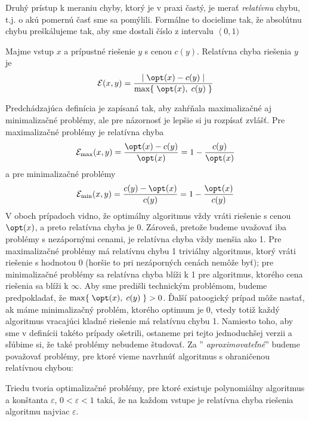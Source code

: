 Druhý prístup k meraniu chyby, ktorý je v praxi častý, je merať {\em relatívnu}
chybu, t.j. o akú pomernú časť sme sa pomýlili. Formálne to docielime tak, že
absolútnu chybu preškálujeme tak, aby sme dostali číslo z intervalu
$\left\langle0,1)\right.$


\begin{framed}
  \begin{dfn}
    Majme vstup $x$ a prípustné riešenie $y$  s cenou $c(y)$. Relatívna chyba riešenia $y$ je
    \[{\cal E}(x,y) = \frac{ |\; \opt(x)-c(y) \;|}{\max\{\; \opt(x), \; c(y)\; \}} \]
  \end{dfn}
\end{framed}

\noindent
Predchádzajúca definícia je zapísaná tak, aby zahŕňala maximalizačné aj
minimalizačné problémy, ale pre názornosť je lepšie si ju rozpísať zvlášť. Pre
maximalizačné problémy je relatívna chyba 
\[ {\cal E}_{\max}(x,y) = \frac{  \opt(x) - c(y) }{\opt(x)} = 1 - \frac{c(y)}{\opt(x)} \] 
a pre minimalizačné
problémy 
\[ {\cal E}_{\min}(x,y) = \frac{ c(y) - \opt(x)  }{c(y)} = 1 -\frac{\opt(x)}{c(y)} \] 
V oboch prípadoch vidno, že optimálny algoritmus vždy
vráti riešenie s cenou $\opt(x)$, a preto relatívna chyba je $0$. Zároveň,
pretože budeme uvažovať iba problémy s nezápornými cenami,  je relatívna chyba
vždy menšia ako 1. Pre maximalizačné problémy má relatívnu chybu 1 triviálny
algoritmus, ktorý vráti riešenie s hodnotou $0$ (horšie to pri nezáporných
cenách nemôže byť); pre minimalizačné problémy sa relatívna chyba blíži k 1 pre
algoritmus, ktorého cena riešenia sa blíži k $\infty$.  
Aby sme predišli technickým problémom, budeme predpokladať, že $\max\{\; \opt(x), \; c(y)\; \}>0$.
Ďalší patoogický prípad môže nastať, ak máme minimalizačný problém, ktorého optimum je 0, vtedy totiž
každý algoritmus vracajúci kladné riešenie má relatívnu chybu 1. Namiesto toho, aby sme 
v definícii takéto prípady ošetrili, ostaneme pri tejto jednoduchšej verzii a sľúbime si, že také
problémy nebudeme študovať.
Za ''{\em
aproximovateľné}'' budeme považovať problémy, pre ktoré vieme navrhnúť
algoritmus s ohraničenou relatívnou chybou:

\begin{framed}
  \begin{dfn}
    \label{dfn:APX}
    Triedu \APX tvoria optimalizačné problémy, pre ktoré existuje polynomiálny algoritmus \algA a konštanta $\varepsilon$,
    $0<\varepsilon<1$ taká, že na každom vstupe je relatívna chyba riešenia algoritmu \algA najviac $\varepsilon$.
  \end{dfn}
\end{framed}

